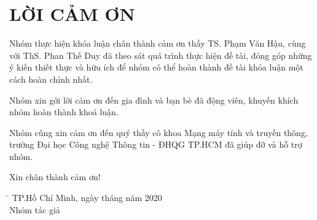 \documentclass[../main-report.tex]{subfiles}
\begin{document}
\part*{LỜI CẢM ƠN}
Nhóm thực hiện khóa luận chân thành cảm ơn thầy TS. Phạm Văn Hậu, cùng với ThS. Phan Thế Duy đã theo sát quá trình thực hiện đề tài, đóng góp những ý kiến thiết thực và hữu ích để nhóm có thể hoàn thành đề tài khóa luận một cách hoàn chỉnh nhất.

Nhóm xin gởi lời cảm ơn đến gia đình và bạn bè đã động viên, khuyến khích nhóm hoàn thành khoá luận.

Nhóm cũng xin cảm ơn đến quý thầy cô khoa Mạng máy tính và truyền thông, trường Đại học Công nghệ Thông tin - ĐHQG TP.HCM đã giúp đỡ và hỗ trợ nhóm.

Xin chân thành cảm ơn!

\begin{tabbing}
\hspace{7cm}\=\kill
  \> TP.Hồ Chí Minh, ngày  tháng  năm 2020 \\
  \> \hspace{2.2cm} Nhóm tác giả
\end{tabbing} 
\end{document}
